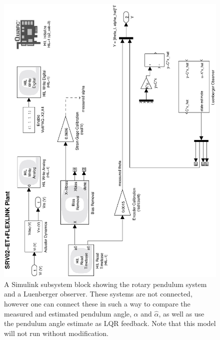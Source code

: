 \documentclass[12pt]{report}
\begin{document}
\begin{figure}[htb!]
    \centering
    \includegraphics[width=0.6\linewidth,angle=-90]{eps/lab_4/lqr_observer_model}
    \caption{A Simulink subsystem block showing the rotary pendulum system and a Luenberger observer. These systems are not connected, however one can connect these in such a way to compare the measured and estimated pendulum angle, $\alpha$ and $\hat{\alpha}$, as well as use the pendulum angle estimate as LQR feedback. Note that this model will not run without modification.}
    \label{figure:lab4_lqr_observer_model}
\end{figure}
\newpage
\end{document}
